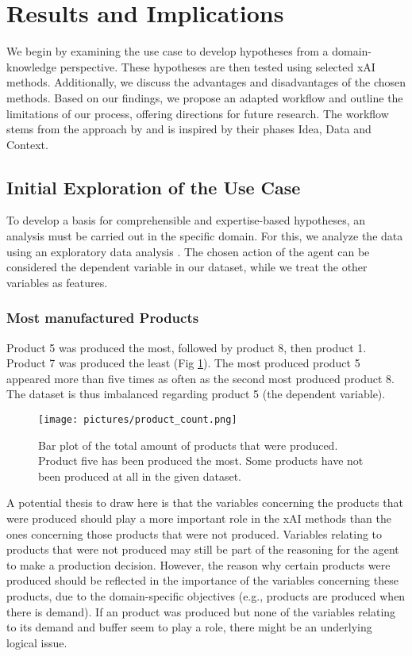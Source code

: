 \section{Results and Implications}
We begin by examining the use case to develop hypotheses from a domain-knowledge perspective. These hypotheses are then tested using selected xAI methods. Additionally, we discuss the advantages and disadvantages of the chosen methods. Based on our findings, we propose an adapted workflow and outline the limitations of our process, offering directions for future research. The workflow stems from the approach by  and is inspired by their phases Idea, Data and Context.

\subsection{Initial Exploration of the Use Case}
To develop a basis for comprehensible and expertise-based hypotheses, an analysis must be carried out in the specific domain. For this, we analyze the data using an exploratory data analysis . The chosen action of the agent can be considered the dependent variable in our dataset, while we treat the other variables as features.

\subsubsection{Most manufactured Products}
Product 5 was produced the most, followed by product 8, then product 1. Product 7 was produced the least (Fig \ref{fig:Produced_aggs}). The most produced product 5 appeared more than five times as often as the second most produced product 8. The dataset is thus imbalanced regarding product 5 (the dependent variable).

\begin{figure}[H]
    \centering
    \texttt{[image: pictures/product\_count.png]}
    \caption{Bar plot of the total amount of products that were produced. Product five has been produced the most. Some products have not been produced at all in the given dataset.}
    \label{fig:Produced_aggs}
\end{figure}

A potential thesis to draw here is that the variables concerning the products that were produced should play a more important role in the xAI methods than the ones concerning those products that were not produced. Variables relating to products that were not produced may still be part of the reasoning for the agent to make a production decision. However, the reason why certain products were produced should be reflected in the importance of the variables concerning these products, due to the domain-specific objectives (e.g., products are produced when there is demand). If an product was produced but none of the variables relating to its demand and buffer seem to play a role, there might be an underlying logical issue.

